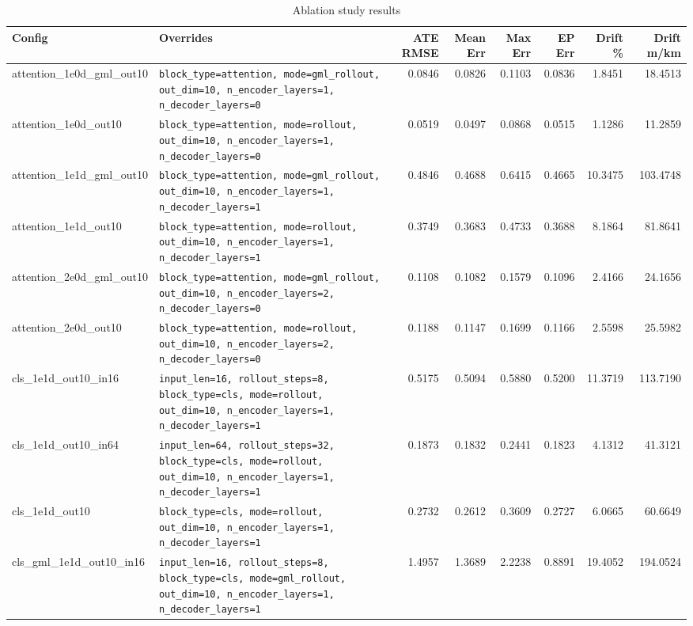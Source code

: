 \begin{table}[ht]
\centering
\caption{Ablation study results}
\label{tab:ablation}
\small
\setlength{\tabcolsep}{4pt}
\begin{tabular}{ll rr rr rr}
\toprule
\textbf{Config} & \textbf{Overrides} &
\textbf{ATE RMSE} & \textbf{Mean Err} &
\textbf{Max Err} & \textbf{EP Err} &
\textbf{Drift \%} & \textbf{Drift m/km} \\
\midrule
attention\_1e0d\_gml\_out10 & \texttt{block\_type=attention, mode=gml\_rollout, out\_dim=10, n\_encoder\_layers=1, n\_decoder\_layers=0} & 0.0846 & 0.0826 & 0.1103 & 0.0836 & 1.8451 & 18.4513 \\
attention\_1e0d\_out10 & \texttt{block\_type=attention, mode=rollout, out\_dim=10, n\_encoder\_layers=1, n\_decoder\_layers=0} & 0.0519 & 0.0497 & 0.0868 & 0.0515 & 1.1286 & 11.2859 \\
attention\_1e1d\_gml\_out10 & \texttt{block\_type=attention, mode=gml\_rollout, out\_dim=10, n\_encoder\_layers=1, n\_decoder\_layers=1} & 0.4846 & 0.4688 & 0.6415 & 0.4665 & 10.3475 & 103.4748 \\
attention\_1e1d\_out10 & \texttt{block\_type=attention, mode=rollout, out\_dim=10, n\_encoder\_layers=1, n\_decoder\_layers=1} & 0.3749 & 0.3683 & 0.4733 & 0.3688 & 8.1864 & 81.8641 \\
attention\_2e0d\_gml\_out10 & \texttt{block\_type=attention, mode=gml\_rollout, out\_dim=10, n\_encoder\_layers=2, n\_decoder\_layers=0} & 0.1108 & 0.1082 & 0.1579 & 0.1096 & 2.4166 & 24.1656 \\
attention\_2e0d\_out10 & \texttt{block\_type=attention, mode=rollout, out\_dim=10, n\_encoder\_layers=2, n\_decoder\_layers=0} & 0.1188 & 0.1147 & 0.1699 & 0.1166 & 2.5598 & 25.5982 \\
cls\_1e1d\_out10\_in16 & \texttt{input\_len=16, rollout\_steps=8, block\_type=cls, mode=rollout, out\_dim=10, n\_encoder\_layers=1, n\_decoder\_layers=1} & 0.5175 & 0.5094 & 0.5880 & 0.5200 & 11.3719 & 113.7190 \\
cls\_1e1d\_out10\_in64 & \texttt{input\_len=64, rollout\_steps=32, block\_type=cls, mode=rollout, out\_dim=10, n\_encoder\_layers=1, n\_decoder\_layers=1} & 0.1873 & 0.1832 & 0.2441 & 0.1823 & 4.1312 & 41.3121 \\
cls\_1e1d\_out10 & \texttt{block\_type=cls, mode=rollout, out\_dim=10, n\_encoder\_layers=1, n\_decoder\_layers=1} & 0.2732 & 0.2612 & 0.3609 & 0.2727 & 6.0665 & 60.6649 \\
cls\_gml\_1e1d\_out10\_in16 & \texttt{input\_len=16, rollout\_steps=8, block\_type=cls, mode=gml\_rollout, out\_dim=10, n\_encoder\_layers=1, n\_decoder\_layers=1} & 1.4957 & 1.3689 & 2.2238 & 0.8891 & 19.4052 & 194.0524 \\

\end{tabular}
\end{table}

